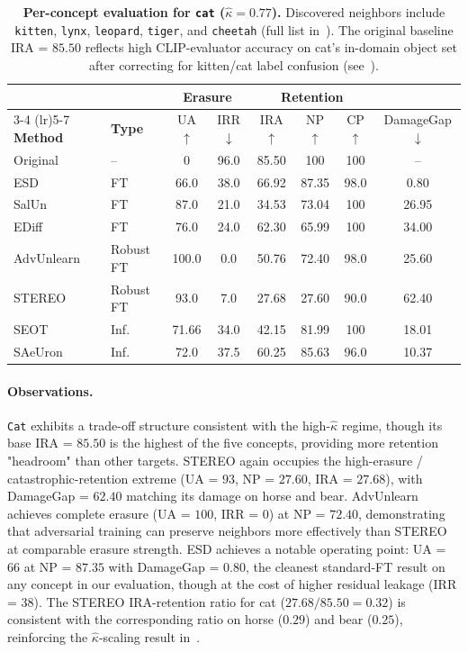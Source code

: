 \begin{table}[ht]
\centering
\small
\setlength{\tabcolsep}{5pt}
\begin{tabular}{llcccccc}
\toprule
& & \multicolumn{2}{c}{\textbf{Erasure}} & \multicolumn{3}{c}{\textbf{Retention}} & \\
\cmidrule(lr){3-4} \cmidrule(lr){5-7}
\textbf{Method} & \textbf{Type} & UA$\uparrow$ & IRR$\downarrow$ & IRA$\uparrow$ & NP$\uparrow$ & CP$\uparrow$ & DamageGap$\downarrow$ \\
\midrule
Original    & --          & 0     & 96.0  & 85.50 & 100   & 100   & --    \\
\midrule
ESD         & FT          & 66.0  & 38.0  & 66.92 & 87.35 & 98.0  & 0.80  \\
SalUn       & FT          & 87.0  & 21.0  & 34.53 & 73.04 & 100   & 26.95 \\
EDiff       & FT          & 76.0  & 24.0  & 62.30 & 65.99 & 100   & 34.00 \\
\midrule
AdvUnlearn  & Robust FT   & 100.0 & 0.0   & 50.76 & 72.40 & 98.0  & 25.60 \\
STEREO      & Robust FT   & 93.0  & 7.0   & 27.68 & 27.60 & 90.0  & 62.40 \\
\midrule
SEOT        & Inf.        & 71.66 & 34.0  & 42.15 & 81.99 & 100   & 18.01 \\
SAeUron     & Inf.        & 72.0  & 37.5  & 60.25 & 85.63 & 96.0  & 10.37 \\
\bottomrule
\end{tabular}
\caption{\textbf{Per-concept evaluation for \texttt{cat} ($\hat\kappa = 0.77$).} Discovered neighbors include \texttt{kitten}, \texttt{lynx}, \texttt{leopard}, \texttt{tiger}, and \texttt{cheetah} (full list in~). The original baseline IRA = $85.50$ reflects high CLIP-evaluator accuracy on cat's in-domain object set after correcting for kitten/cat label confusion (see~).}
\label{tab:per_concept_cat}
\end{table}

\paragraph{Observations.}
\texttt{Cat} exhibits a trade-off structure consistent with the high-$\hat\kappa$ regime, though its base IRA = $85.50$ is the highest of the five concepts, providing more retention "headroom" than other targets. STEREO again occupies the high-erasure / catastrophic-retention extreme (UA = $93$, NP = $27.60$, IRA = $27.68$), with DamageGap = $62.40$ matching its damage on horse and bear. AdvUnlearn achieves complete erasure (UA = $100$, IRR = $0$) at NP = $72.40$, demonstrating that adversarial training can preserve neighbors more effectively than STEREO at comparable erasure strength. ESD achieves a notable operating point: UA = $66$ at NP = $87.35$ with DamageGap = $0.80$, the cleanest standard-FT result on any concept in our evaluation, though at the cost of higher residual leakage (IRR = $38$). The STEREO IRA-retention ratio for cat ($27.68 / 85.50 = 0.32$) is consistent with the corresponding ratio on horse ($0.29$) and bear ($0.25$), reinforcing the $\hat\kappa$-scaling result in~.
